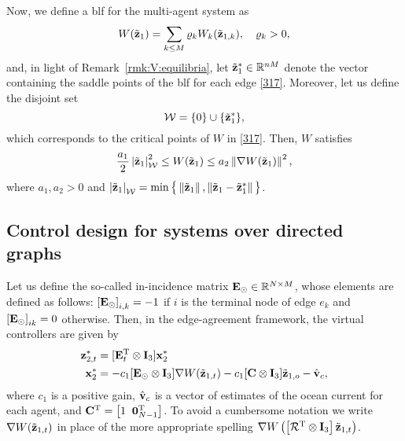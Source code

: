 Now, we define a \gls{blf} for the multi-agent system as
\begin{equation}\label{512}
W(\tilde{\mathbf{z}}_{1})=\sum_{k\leq M} \varrho_k W_k(\tilde{\mathbf{z}}_{1, k}), \quad \varrho_k>0,
\end{equation}
and, in light of Remark~\ref{rmk:V:equilibria}, let $\tilde{\mathbf{z}}_1^*\in\mathbb{R}^{nM}$ denote the vector containing the saddle points of the \gls{blf} for each edge \eqref{317}.
Moreover, let us define the disjoint set
\begin{equation}\label{517}
\mathcal{W}=\{0\}\cup\{\tilde{\mathbf{z}}_1^*\},
\end{equation}
which corresponds to the critical points of $W$ in \eqref{317}.
Then, $W$ satisfies
\begin{equation}\label{eq:BLF-bounds}
\frac{a_1}{2}\left|\tilde{\mathbf{z}}_{1}\right|_{\mathcal{W}}^2 \leq W(\tilde{\mathbf{z}}_{1}) \leq a_2\left\|\nabla W(\tilde{\mathbf{z}}_{1})\right\|^2,
\end{equation}
where $a_{1}, a_2 > 0$ and $\left|\tilde{\mathbf{z}}_{1}\right|_{\mathcal{W}} = \min \big\{\left\|\tilde{\mathbf{z}}_{1}\right\|, \left\|\tilde{\mathbf{z}}_{1} - \tilde{\mathbf{z}}_{1}^*\right\|\big\}$.

\subsection{Control design for systems over directed graphs}

Let us define the so-called in-incidence matrix $\mathbf{E}_\odot \in \mathbb{R}^{N\times M}$, whose elements are defined as follows: $\left[\mathbf{E}_\odot\right]_{i, k} = -1$ if $i$ is the terminal node of edge $e_k$ and $\left[\mathbf{E}_\odot\right]_{ik} = 0$ otherwise. Then, in the edge-agreement framework, the virtual controllers are given by
\begin{equation}\label{n284}\begin{aligned}[b]
\mathbf{z}_{2, t}^*&=[\mathbf{E}_t^{\mathrm{T}} \otimes \mathbf{I}_3] \mathbf{x}_2^*\\
\mathbf{x}_2^*&=-c_1[\mathbf{E}_\odot\otimes \mathbf{I}_3] \nabla W(\tilde{\mathbf{z}}_{1, t})-c_1[\mathbf{C}\otimes \mathbf{I}_3]\tilde{\mathbf{z}}_{1, o} - \hat{\mathbf{v}}_c,
\end{aligned}\end{equation}
where $c_1$ is a positive gain, $\hat{\mathbf{v}}_c$ is a vector of estimates of the ocean current for each agent, and $\mathbf{C}^{\mathrm{T}}=\left[1\;\;\mathbf{0}_{N-1}^{\mathrm{T}}\right]$.
To avoid a cumbersome notation we write $\nabla W(\tilde{\mathbf{z}}_{1, t})$ in place of the more appropriate spelling $\nabla W\left(\left[\mathcal{R}^{\mathrm{T}}\otimes \mathbf{I}_3\right]\tilde{\mathbf{z}}_{1, t}\right)$.

